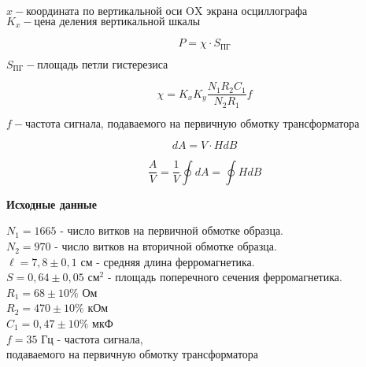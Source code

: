 \begin{center}
    $x - \text{координата по вертикальной оси OX экрана осциллографа}$ \\
    $K_x - \text{цена деления вертикальной шкалы}$
\end{center}

\[
    P = \chi \cdot S_{\text{ПГ}}
\]

\begin{center}
    $S_\text{ПГ} - \text{площадь петли гистерезиса}$
\end{center}

\[
    \chi = K_x K_y\frac{N_1 R_2 C_1}{N_2 R_1}f
\]

\begin{center}
    $f - \text{частота сигнала, подаваемого на первичную обмотку трансформатора}$
\end{center}

\[
    dA = V \cdot H dB
\]

\[
    \frac{A}{V} = \frac{1}{V} \oint dA = \oint H dB
\]

\textbf{Исходные данные}
\begin{center}
    $N_1 = 1665$ - число витков на первичной обмотке образца. \\
    $N_2 = 970$ - число витков на вторичной обмотке образца. \\
    $\ell = 7,8 \pm 0,1$ см - средняя длина ферромагнетика. \\
    $S = 0,64 \pm 0,05$ см$^2$ - площадь поперечного сечения ферромагнетика. \\
    $R_1 = 68 \pm 10\%$ Ом \\
    $R_2 = 470 \pm 10\%$ кОм \\
    $C_1 = 0,47 \pm 10\%$ мкФ \\
    $f = 35$ Гц - частота сигнала, \\ подаваемого на первичную обмотку трансформатора
\end{center}